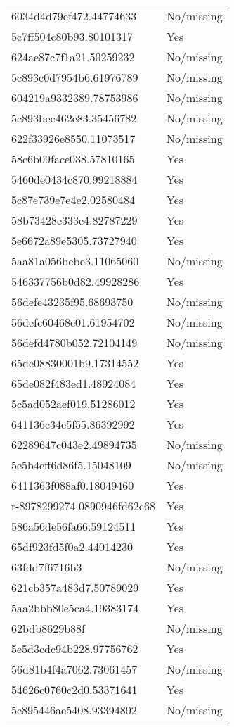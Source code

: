 \begin{tabular}{ll}
6034d4d79ef472.44774633 & No/missing \\
5c7ff504c80b93.80101317 & Yes \\
624ae87c7f1a21.50259232 & No/missing \\
5c893c0d7954b6.61976789 & No/missing \\
604219a9332389.78753986 & No/missing \\
5c893bec462e83.35456782 & No/missing \\
622f33926e8550.11073517 & No/missing \\
58c6b09face038.57810165 & Yes \\
5460de0434c870.99218884 & Yes \\
5c87e739e7e4e2.02580484 & Yes \\
58b73428e333e4.82787229 & Yes \\
5e6672a89e5305.73727940 & Yes \\
5aa81a056bcbe3.11065060 & No/missing \\
546337756b0d82.49928286 & Yes \\
56defe43235f95.68693750 & No/missing \\
56defc60468e01.61954702 & No/missing \\
56defd4780b052.72104149 & No/missing \\
65de08830001b9.17314552 & Yes \\
65de082f483ed1.48924084 & Yes \\
5c5ad052aef019.51286012 & Yes \\
641136c34e5f55.86392992 & Yes \\
62289647c043e2.49894735 & No/missing \\
5e5b4eff6d86f5.15048109 & No/missing \\
6411363f088af0.18049460 & Yes \\
r-8978299274.0890946fd62c68 & Yes \\
586a56de56fa66.59124511 & Yes \\
65df923fd5f0a2.44014230 & Yes \\
63fdd7f6716b3 & No/missing \\
621cb357a483d7.50789029 & Yes \\
5aa2bbb80e5ca4.19383174 & Yes \\
62bdb8629b88f & No/missing \\
5e5d3cdc94b228.97756762 & Yes \\
56d81b4f4a7062.73061457 & No/missing \\
54626c0760c2d0.53371641 & Yes \\
5c895446ae5408.93394802 & No/missing \\

\end{tabular}
